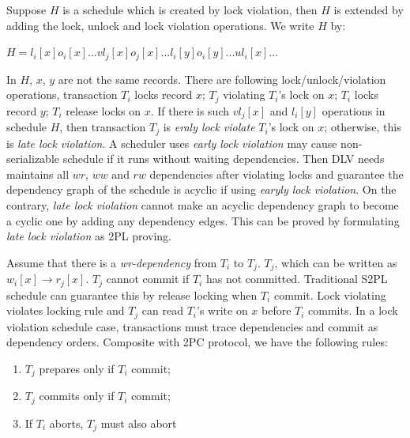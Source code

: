 \documentclass[conference]{IEEEtran}
\begin{document}
Suppose ${H}$ is a schedule which is created by lock violation, then ${H}$ is extended by adding the lock, unlock and lock violation operations.
We write ${H}$ by:
\begin{center}
  ${H = l_i[x] o_i[x]... vl_j[x] o_j[x]...  l_i[y] o_i[y]... ul_i[x] ... }$

\end{center}
In ${H}$, ${x}$, ${y}$ are not the same records.
There are following lock/unlock/violation operations,
transaction ${T_i}$ locks record ${x}$;
${T_j}$ violating  ${T_i}$'s lock on ${x}$;
${T_i}$ locks record ${y}$;
${T_i}$ release locks on ${x}$.
If there is such $vl_j[x]$ and $l_i[y]$ operations in schedule ${H}$,
then transaction ${T_j}$ is \emph{eraly lock violate} ${T_i}$'s lock on ${x}$;
otherwise, this is \emph{late lock violation}.
A scheduler uses \emph{early lock violation} may cause non-serializable schedule if it runs without waiting dependencies.
Then DLV needs maintains all $wr$, $ww$ and $rw$ dependencies after violating locks and guarantee the dependency graph of the schedule is acyclic if using \emph{earyly lock violation}. 
On the contrary, \emph{late lock violation} cannot make an acyclic dependency graph to become a cyclic one by adding any dependency edges.
This can be proved by formulating \emph{late lock violation} as 2PL proving.


Assume that there is a \emph{wr-dependency} from ${T_i}$ to ${T_j}$.
    ${T_j}$, which can be written as ${w_i[x] \rightarrow r_j[x]}$.
${T_j}$ cannot commit if ${T_i}$ has not committed.
Traditional S2PL schedule can guarantee this by release locking when ${T_i}$ commit.
Lock violating violates locking rule and ${T_j}$ can read ${T_i}$'s write on ${x}$ before ${T_i}$ commits.
In a lock violation schedule case, transactions must trace dependencies and commit as dependency orders. 
Composite with 2PC protocol, we have the following rules:

\begin{enumerate}
  \item ${T_j}$ prepares only if ${T_i}$ commit;
  \label{rule:prepare}

  \item  ${T_j}$ commits only if ${T_i}$ commit;
  \label{rule:commit} 
  
  \item If ${T_i}$ aborts, ${T_j}$ must also abort

  \label{rule:abort} 
    \end{enumerate}
\end{document}
